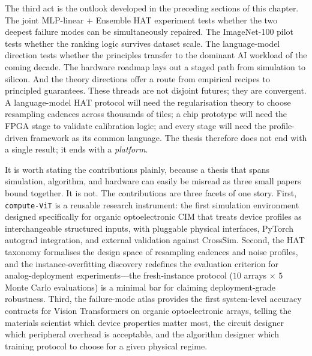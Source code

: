 The third act is the outlook developed in the preceding sections of this chapter.  The joint MLP-linear + Ensemble HAT experiment tests whether the two deepest failure modes can be simultaneously repaired.  The ImageNet-100 pilot tests whether the ranking logic survives dataset scale.  The language-model direction tests whether the principles transfer to the dominant AI workload of the coming decade.  The hardware roadmap lays out a staged path from simulation to silicon.  And the theory directions offer a route from empirical recipes to principled guarantees.  These threads are not disjoint futures; they are convergent.  A language-model HAT protocol will need the regularisation theory to choose resampling cadences across thousands of tiles; a chip prototype will need the FPGA stage to validate calibration logic; and every stage will need the profile-driven framework as its common language.  The thesis therefore does not end with a single result; it ends with a \emph{platform}.

It is worth stating the contributions plainly, because a thesis that spans simulation, algorithm, and hardware can easily be misread as three small papers bound together.  It is not.  The contributions are three facets of one story.  First, \texttt{compute-ViT} is a reusable research instrument: the first simulation environment designed specifically for organic optoelectronic CIM that treats device profiles as interchangeable structured inputs, with pluggable physical interfaces, PyTorch autograd integration, and external validation against CrossSim.  Second, the HAT taxonomy formalises the design space of resampling cadences and noise profiles, and the instance-overfitting discovery redefines the evaluation criterion for analog-deployment experiments---the fresh-instance protocol ($10$ arrays $\times$ $5$ Monte Carlo evaluations) is a minimal bar for claiming deployment-grade robustness.  Third, the failure-mode atlas provides the first system-level accuracy contracts for Vision Transformers on organic optoelectronic arrays, telling the materials scientist which device properties matter most, the circuit designer which peripheral overhead is acceptable, and the algorithm designer which training protocol to choose for a given physical regime.

